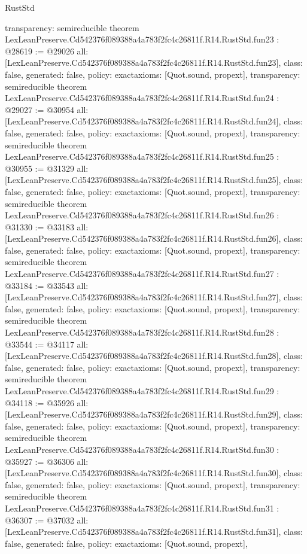\begin{lexlean}{RustStd}
\begin{coremodule}
{  transparency: semireducible
}
theorem LexLeanPreserve.Cd542376f089388a4a783f2fc4c26811f.R14.RustStd.fun23 : @28619 := @29026 {
  all: [LexLeanPreserve.Cd542376f089388a4a783f2fc4c26811f.R14.RustStd.fun23],
  class: false,
  generated: false,
  policy: exact{axioms: [Quot.sound, propext]},
  transparency: semireducible
}
theorem LexLeanPreserve.Cd542376f089388a4a783f2fc4c26811f.R14.RustStd.fun24 : @29027 := @30954 {
  all: [LexLeanPreserve.Cd542376f089388a4a783f2fc4c26811f.R14.RustStd.fun24],
  class: false,
  generated: false,
  policy: exact{axioms: [Quot.sound, propext]},
  transparency: semireducible
}
theorem LexLeanPreserve.Cd542376f089388a4a783f2fc4c26811f.R14.RustStd.fun25 : @30955 := @31329 {
  all: [LexLeanPreserve.Cd542376f089388a4a783f2fc4c26811f.R14.RustStd.fun25],
  class: false,
  generated: false,
  policy: exact{axioms: [Quot.sound, propext]},
  transparency: semireducible
}
theorem LexLeanPreserve.Cd542376f089388a4a783f2fc4c26811f.R14.RustStd.fun26 : @31330 := @33183 {
  all: [LexLeanPreserve.Cd542376f089388a4a783f2fc4c26811f.R14.RustStd.fun26],
  class: false,
  generated: false,
  policy: exact{axioms: [Quot.sound, propext]},
  transparency: semireducible
}
theorem LexLeanPreserve.Cd542376f089388a4a783f2fc4c26811f.R14.RustStd.fun27 : @33184 := @33543 {
  all: [LexLeanPreserve.Cd542376f089388a4a783f2fc4c26811f.R14.RustStd.fun27],
  class: false,
  generated: false,
  policy: exact{axioms: [Quot.sound, propext]},
  transparency: semireducible
}
theorem LexLeanPreserve.Cd542376f089388a4a783f2fc4c26811f.R14.RustStd.fun28 : @33544 := @34117 {
  all: [LexLeanPreserve.Cd542376f089388a4a783f2fc4c26811f.R14.RustStd.fun28],
  class: false,
  generated: false,
  policy: exact{axioms: [Quot.sound, propext]},
  transparency: semireducible
}
theorem LexLeanPreserve.Cd542376f089388a4a783f2fc4c26811f.R14.RustStd.fun29 : @34118 := @35926 {
  all: [LexLeanPreserve.Cd542376f089388a4a783f2fc4c26811f.R14.RustStd.fun29],
  class: false,
  generated: false,
  policy: exact{axioms: [Quot.sound, propext]},
  transparency: semireducible
}
theorem LexLeanPreserve.Cd542376f089388a4a783f2fc4c26811f.R14.RustStd.fun30 : @35927 := @36306 {
  all: [LexLeanPreserve.Cd542376f089388a4a783f2fc4c26811f.R14.RustStd.fun30],
  class: false,
  generated: false,
  policy: exact{axioms: [Quot.sound, propext]},
  transparency: semireducible
}
theorem LexLeanPreserve.Cd542376f089388a4a783f2fc4c26811f.R14.RustStd.fun31 : @36307 := @37032 {
  all: [LexLeanPreserve.Cd542376f089388a4a783f2fc4c26811f.R14.RustStd.fun31],
  class: false,
  generated: false,
  policy: exact{axioms: [Quot.sound, propext]},
}
\end{coremodule}
\end{lexlean}
